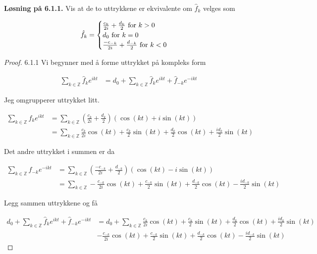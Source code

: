 \documentclass[a4paper,norsk]{article}
\newenvironment{oppgave}[1]%
	{\trivlist{}\item\relax\textbf{Løsning på #1.}\medspace}%
	{\endtrivlist}
\begin{document}
\begin{oppgave}{6.1.1}
Vis at de to uttrykkene er ekvivalente om $ \hat{f}_k $  velges som

\[
    \hat{f}_k = \begin{cases}
      \frac{ c_k }{ 2i } + \frac{ d_k }{ 2 } \text{ for $ k > 0 $ }\\ 
      d_0 \text{ for $ k=0 $ }\\
      \frac{ -c_{-k} }{ 2i } + \frac{ d_{-k} }{ 2 } \text{ for $ k< 0 $ }
    \end{cases}
\]

\begin{proof}{6.1.1}
Vi begynner med å forme uttrykket på kompleks form

\begin{align*}
  \sum_{ k \in \mathbb{Z} }^{  } \hat{f}_k e^{ikt} &= d_0 + \sum_{ k \in \mathbb{Z} }^{  } \hat{f}_k e^{ikt} + \hat{f}_{-k} e^{-ikt}
\end{align*}

Jeg omgrupperer uttrykket litt.

\begin{align*}
  \sum_{ k \in \mathbb{Z} }^{  } \hat{f}_k e^{ikt} &= \sum_{ k \in \mathbb{Z} }^{  }  \left( \frac{ c_k }{ 2i } + \frac{ d_k }{ 2 } \right) \left( \cos(kt) + i \sin(kt) \right) \\
  &= \sum_{ k \in \mathbb{Z} }^{  } \frac{ c_k }{ 2i } \cos(kt) + \frac{ c_k }{ 2 } \sin(kt) + \frac{ d_k }{ 2 } \cos(kt) + \frac{i d_k }{ 2 } \sin(kt) 
\end{align*}

Det andre uttrykket i summen er da

\begin{align*}
  \sum_{ k \in \mathbb{Z} }^{  } \hat{f}_{-k} e^{-ikt} &= \sum_{ k \in \mathbb{Z} }^{  } \left( \frac{ -c_{-k} }{ 2i } + \frac{ d_{-k} }{ 2 }  \right) \left( \cos(kt) - i \sin(kt) \right) \\
  &= \sum_{ k \in \mathbb{Z} }^{  }  - \frac{ c_{-k} }{ 2i } \cos(kt) + \frac{ c_{-k} }{ 2 } \sin(kt) + \frac{ d_{-k} }{ 2 } \cos(kt) - \frac{ i d_{-k}  }{ 2 }  \sin(kt) 
\end{align*}

Legg sammen uttrykkene og få

\begin{align*}
  d_0 + \sum_{ k \in \mathbb{Z} }^{  } \hat{f}_k e^{ikt} + \hat{f}_{-k} e^{-ikt} &= d_0 + \sum_{ k \in \mathbb{Z} }^{  } \frac{ c_k }{ 2i } \cos(kt) + \frac{ c_k }{ 2 } \sin(kt) + \frac{ d_k }{ 2 } \cos(kt) + \frac{i d_k }{ 2 } \sin(kt)\\ 
  &- \frac{ c_{-k} }{ 2i } \cos(kt) + \frac{ c_{-k} }{ 2 } \sin(kt) + \frac{ d_{-k} }{ 2 } \cos(kt) - \frac{ i d_{-k}  }{ 2 }  \sin(kt) 
\end{align*}


\end{proof}
\end{oppgave}
\end{document}
